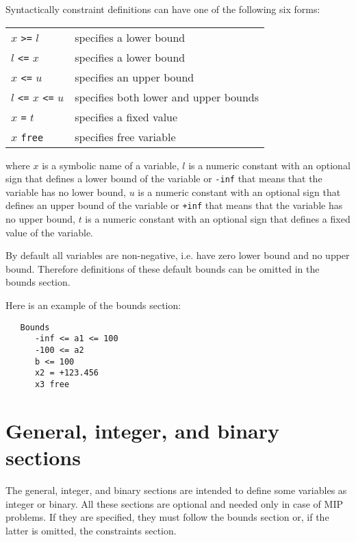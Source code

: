 \newpage

Syntactically constraint definitions can have one of the following six
forms:

\begin{center}
\begin{tabular}{ll}
$x$ \verb|>=| $l$ &              specifies a lower bound \\
$l$ \verb|<=| $x$ &              specifies a lower bound \\
$x$ \verb|<=| $u$ &              specifies an upper bound \\
$l$ \verb|<=| $x$ \verb|<=| $u$ &specifies both lower and upper bounds\\
$x$ \verb|=| $t$                &specifies a fixed value \\
$x$ \verb|free|                 &specifies free variable
\end{tabular}
\end{center}

\noindent
where $x$ is a symbolic name of a variable, $l$ is a numeric constant
with an optional sign that defines a lower bound of the variable or
\verb|-inf| that means that the variable has no lower bound, $u$ is a
numeric constant with an optional sign that defines an upper bound of
the variable or \verb|+inf| that means that the variable has no upper
bound, $t$ is a numeric constant with an optional sign that defines a
fixed value of the variable.

By default all variables are non-negative, i.e. have zero lower bound
and no upper bound. Therefore definitions of these default bounds can
be omitted in the bounds section.

Here is an example of the bounds section:

\begin{verbatim}
   Bounds
      -inf <= a1 <= 100
      -100 <= a2
      b <= 100
      x2 = +123.456
      x3 free
\end{verbatim}

\section{General, integer, and binary sections}

The general, integer, and binary sections are intended to define
some variables as integer or binary. All these sections are optional
and needed only in case of MIP problems. If they are specified, they
must follow the bounds section or, if the latter is omitted, the
constraints section.

